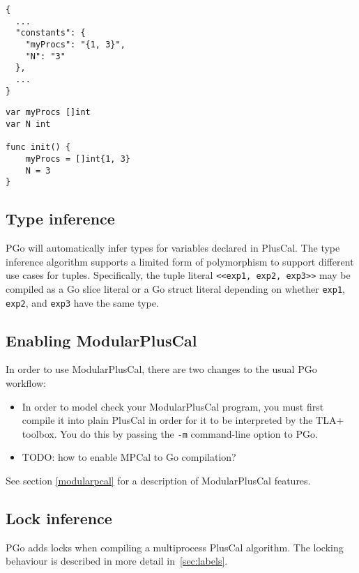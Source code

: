 \noindent\begin{minipage}{0.45\textwidth}
\begin{lstlisting}
{
  ...
  "constants": {
    "myProcs": "{1, 3}",
    "N": "3"
  },
  ...
}
\end{lstlisting}
\end{minipage}
\hfill\begin{minipage}{0.45\textwidth}
\begin{lstlisting}[language=golang]
var myProcs []int
var N int

func init() {
	myProcs = []int{1, 3}
	N = 3
}
\end{lstlisting}
\end{minipage}

\subsection{Type inference}
PGo will automatically infer types for variables declared in PlusCal. The type inference algorithm supports a limited form of polymorphism to support different use cases for tuples. Specifically, the tuple literal \lstinline[language=pcal]|<<exp1, exp2, exp3>>| may be compiled as a Go slice literal or a Go struct literal depending on whether \lstinline[language=pcal]|exp1|, \lstinline[language=pcal]|exp2|, and \lstinline[language=pcal]|exp3| have the same type.

\subsection{Enabling ModularPlusCal}

In order to use ModularPlusCal, there are two changes to the usual PGo workflow:
\begin{itemize}
    \item In order to model check your ModularPlusCal program, you must first compile it into plain PlusCal in order for it to be interpreted by the TLA+ toolbox. You do this by passing the \lstinline|-m| command-line option to PGo.
    \item TODO: how to enable MPCal to Go compilation?
\end{itemize}

See section \ref{modularpcal} for a description of ModularPlusCal features.

\subsection{Lock inference}
PGo adds locks when compiling a multiprocess PlusCal algorithm. The locking behaviour is described in more detail in~\ref{sec:labels}.
